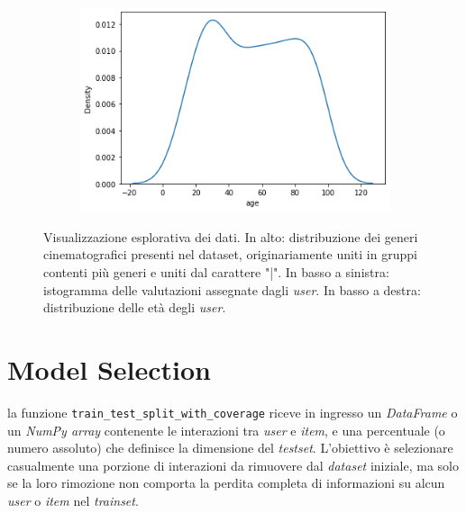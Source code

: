 \begin{figure}[htbp]
\begin{subfigure}[b]{0.49\textwidth}
    \end{subfigure}
    \hfill
    \begin{subfigure}[b]{0.49\textwidth}
        \includegraphics[width=\textwidth]{figures/visualization/output3.png}
    \end{subfigure}

    \caption{Visualizzazione esplorativa dei dati. In alto: distribuzione dei generi cinematografici presenti nel dataset, originariamente uniti in gruppi contenti più generi e uniti dal carattere "|". In basso a sinistra: istogramma delle valutazioni assegnate dagli \textit{user}. In basso a destra: distribuzione delle età degli \textit{user}.}
\end{figure}

\section{Model Selection}

la funzione \texttt{train\_test\_split\_with\_coverage} riceve in ingresso un \textit{DataFrame} o un \textit{NumPy array} contenente le interazioni tra \textit{user} e \textit{item}, e una percentuale (o numero assoluto) che definisce la dimensione del \textit{testset}. L'obiettivo è selezionare casualmente una porzione di interazioni da rimuovere dal \textit{dataset} iniziale, ma solo se la loro rimozione non comporta la perdita completa di informazioni su alcun \textit{user} o \textit{item} nel \textit{trainset}.


